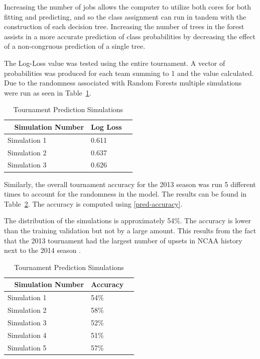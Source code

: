 \documentclass[conference]{IEEEtran}
\begin{document}
{Increasing the number of jobs allows the computer to utilize both cores for both fitting and predicting, and so the class assignment can run in tandem with the construction of each decision tree. 
Increasing the number of trees in the forest assists in a more accurate prediction of class probabilities by decreasing the effect of a non-congruous prediction of a single tree.

The Log-Loss value was tested using the entire tournament.
A vector of probabilities was produced for each team summing to 1 and the value calculated.
Due to the randomness associated with Random Forests multiple simulations were run as seen in Table~\ref{tab:ll_table}.

\begin{table}[H]
	\centering
    \begin{tabular}{|l|l|l|}
    \hline
    ~   \textbf{Simulation Number}  & \textbf{Log Loss} \\ \hline
    Simulation 1 & 0.611  \\ \hline
    Simulation 2 & 0.637\\ \hline
    Simulation 3 &  0.626\\ \hline
    \end{tabular}
    \caption {Tournament Prediction Simulations}
    \label{tab:ll_table}
\end{table}

Similarly, the overall tournament accuracy for the 2013 season was run 5 different times to account for the randomness in the model. The results can be found in Table~\ref{tab:thetable}. 
The accuracy is computed using \eqref{pred-accuracy}.

The distribution of the simulations is approximately 54\%.
The accuracy is lower than the training validation but not by a large amount. 
This results from the fact that the 2013 tournament had the largest number of upsets in NCAA history next to the 2014 season \cite{BenZauzmer:2014}.
 
\begin{table}[H]
	\centering
    \begin{tabular}{|l|l|l|}
    \hline
    ~   \textbf{Simulation Number}  & \textbf{Accuracy} \\ \hline
    Simulation 1 & 54\%  \\ \hline
    Simulation 2 & 58\% \\ \hline
    Simulation 3 & 52\% \\ \hline
    Simulation 4 & 51\% \\ \hline
    Simulation 5 & 57\%\\ \hline
    \end{tabular}
    \caption {Tournament Prediction Simulations}
    \label{tab:thetable}
\end{table}

}
\end{document}
